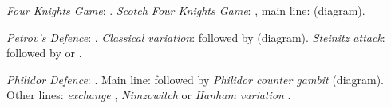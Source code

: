\hspace{5mm}
\begin{minipage}[t]{.175\linewidth}
\raggedright
\begin{center}
\scalebox{.560}{\showboard}
\end{center}
\newgame
\emph{Four Knights Game}: .
\emph{Scotch Four Knights Game}: , main line:  (diagram).
\vspace{2mm}
\end{minipage}
\hspace{5mm}
\begin{minipage}[t]{.175\linewidth}
\raggedright
\begin{center}
\scalebox{.560}{\showboard}
\end{center}
\newgame
\emph{Petrov's Defence}: .
\emph{Classical variation}:  followed by  (diagram).
\emph{Steinitz attack}:  followed by  or .
\vspace{2mm}
\end{minipage}
\hspace{5mm}
\begin{minipage}[t]{.175\linewidth}
\raggedright
\begin{center}
\scalebox{.560}{\showboard}
\end{center}
\newgame
\emph{Philidor Defence}: .
Main line:  followed by \emph{Philidor counter gambit}  (diagram).
Other lines: \emph{exchange} , \emph{Nimzowitch}  or \emph{Hanham variation} .
\vspace{2mm}
\end{minipage}
